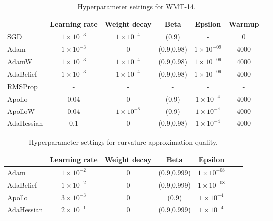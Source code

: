 \begin{table}[h!]
    \centering
    \caption{Hyperparameter settings for WMT-14.}
    \label{tab:wmt14-params}
    \begin{tabular}{lcccccc}  %
        \toprule
        & \textbf{Learning rate} & \textbf{Weight decay} & \textbf{Beta} & \textbf{Epsilon} & \textbf{Warmup}  \\
        \midrule
        SGD         & $1 \times 10^{-3}$ & $1 \times 10 ^{-4} $ & (0.9) & - & 0  \\
        Adam        & $1 \times 10^{-3}$ & 0  & (0.9,0.98) & $1 \times 10^{-09}$ & 4000     \\
        AdamW        & $1 \times 10^{-3}$ & $1 \times 10 ^{-4}$  & (0.9,0.98) & $1 \times 10^{-09}$ & 4000 \\
        AdaBelief   & $1 \times 10^{-3}$ & $1 \times 10 ^{-4}$   & (0.9,0.98) & $1 \times 10^{-09}$ & 4000  \\
        RMSProp     & - & - & - & -& - \\
        Apollo      & 0.04  & 0  & (0.9) & $1 \times 10 ^{-4} $ & 4000  \\
        ApolloW     & 0.04  & $1 \times 10^{-8}$  & (0.9) & $1 \times 10 ^{-4} $ & 4000  \\
        AdaHessian  & 0.1 & 0  & (0.9,0.98) &$1 \times 10 ^{-4} $& 4000 \\
        \bottomrule
    \end{tabular}
\end{table}

\begin{table}[h!]
    \centering
    \caption{Hyperparameter settings for curvature approximation quality.}
    \label{tab:curve-approx-params}
    \begin{tabular}{lcccccc}  %
        \toprule
        & \textbf{Learning rate} & \textbf{Weight decay} & \textbf{Beta} & \textbf{Epsilon} \\
        \midrule
        Adam        & $1 \times 10^{-2}$ & 0  & (0.9,0.999) & $1 \times 10^{-08}$   \\
        AdaBelief   & $1 \times 10^{-2}$ & 0   & (0.9,0.999) & $1 \times 10^{-08}$   \\
        Apollo      & $3 \times 10^{-3}$  & 0  & (0.9)  & $1 \times 10 ^{-4} $  \\
        AdaHessian  & $2 \times 10^{-1}$ & 0  & (0.9,0.999) &   $1 \times 10 ^{-4} $ \\
        \bottomrule
    \end{tabular}
\end{table}



